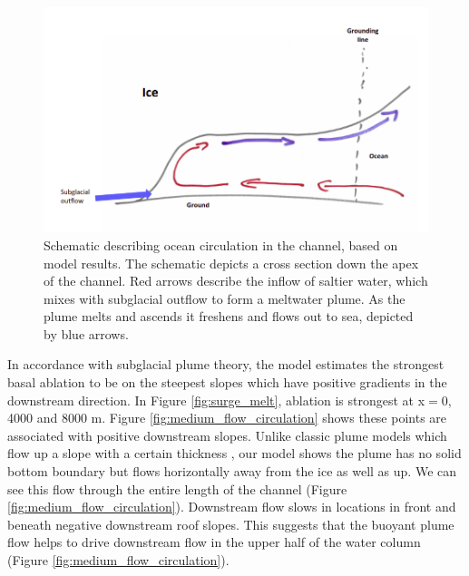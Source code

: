 \begin{figure}[!ht]
\centering
\includegraphics[width=1\textwidth]{chapters/4/channel_schematic.png}
\caption[Circulation schematic]{Schematic describing ocean circulation in the channel, based on model results. The schematic depicts a cross section down the apex of the channel. Red arrows describe the inflow of saltier water, which mixes with subglacial outflow to form a meltwater plume. As the plume melts and ascends it freshens and flows out to sea, depicted by blue arrows.}
\label{fig:circ_schematic}
\end{figure}


In accordance with subglacial plume theory, the model estimates the strongest basal ablation to be on the steepest slopes which have  positive gradients in the downstream direction. In Figure \ref{fig:surge_melt}, ablation is strongest at x$=$0, 4000 and 8000 m. Figure \ref{fig:medium_flow_circulation} shows these points are associated with positive downstream slopes. 
Unlike classic plume models which flow up a slope with a certain thickness \citep[e.g.][]{hewitt2020subglacial}, our model shows the plume has no solid bottom boundary but flows horizontally away from the ice as well as up. We can see this flow through the entire length of the channel (Figure \ref{fig:medium_flow_circulation}). Downstream flow slows in locations in front and beneath negative downstream roof slopes. This suggests that the buoyant plume flow helps to drive downstream flow in the upper half of the water column (Figure \ref{fig:medium_flow_circulation}).


